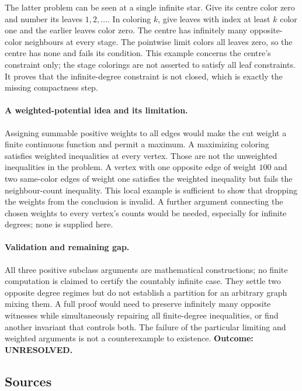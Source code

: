 \documentclass[11pt,a4paper]{article}
\begin{document}
The latter problem can be seen at a single infinite star. Give its
centre color zero and number its leaves $1,2,\ldots$. In coloring
$k$, give leaves with index at least $k$ color one and the earlier
leaves color zero. The centre has infinitely many opposite-color
neighbours at every stage. The pointwise limit colors all leaves zero,
so the centre has none and fails its condition. This example concerns
the centre's constraint only; the stage colorings are not asserted
to satisfy all leaf constraints. It proves that the infinite-degree
constraint is not closed, which is exactly the missing compactness
step.

\paragraph{A weighted-potential idea and its limitation.}
Assigning summable positive weights to all edges would make the cut
weight a finite continuous function and permit a maximum. A maximizing
coloring satisfies weighted inequalities at every vertex. Those are not
the unweighted inequalities in the problem. A vertex with one opposite
edge of weight $100$ and two same-color edges of weight one satisfies
the weighted inequality but fails the neighbour-count inequality.
This local example is sufficient to show that dropping the weights
from the conclusion is invalid. A further argument connecting the
chosen weights to every vertex's counts would be needed, especially
for infinite degrees; none is supplied here.

\paragraph{Validation and remaining gap.}
All three positive subclass arguments are mathematical constructions;
no finite computation is claimed to certify the countably infinite
case. They settle two opposite degree regimes but do not establish a
partition for an arbitrary graph mixing them. A full proof would need
to preserve infinitely many opposite witnesses while simultaneously
repairing all finite-degree inequalities, or find another invariant
that controls both. The failure of the particular limiting and weighted
arguments is not a counterexample to existence.
\textbf{Outcome: UNRESOLVED.}

\subsection{Sources}
\end{document}
